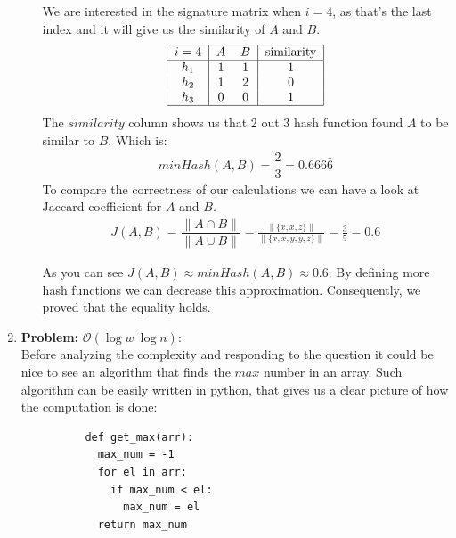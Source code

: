 \documentclass[11pt,a4paper,english]{article}
\begin{document}
\begin{enumerate}
\begin{enumerate}
            We are interested in the signature matrix when $i=4$, as that's the last index and it will give us the similarity of $A$ and $B$.
            \begin{align*}
              \begin{tabular}{|c | c c | c | }\hline
                $i=4$ & $A$ & $B$ & similarity\\ \hline
                $h_1$ &  1  &  1  & 1\\
                $h_2$ &  1  &  2  & 0\\
                $h_3$ &  0  &  0  & 1\\  \hline
              \end{tabular}
            \end{align*}
            The $similarity$ column shows us that 2 out 3 hash function found $A$ to be similar to $B$. Which is:
            \begin{align*}
              minHash(A,B) = \dfrac{2}{3} = 0.666\bar{6}
            \end{align*}
            To compare the correctness of our calculations we can have a look at Jaccard coefficient for $A$ and $B$.
            \begin{align*}
              J(A,B) = \dfrac{\| A \cap B \|}{\| A \cup B \|} =
              \frac{ \| \{ x,x,z\} \| }{ \| \{ x,x,y,y,z \} \| } = \frac{3}{5} = 0.6
            \end{align*}

            As you can see $J(A,B) \approx minHash(A,B) \approx 0.6$. By defining more hash functions we can decrease this approximation. Consequently, we proved that the equality holds.
        \end{enumerate}

      \item \textbf{Problem:} $\mathcal{O}(\log{w}\ \log{n})$: \\
        Before analyzing the complexity and responding to the question it could be nice to see an algorithm that finds the $max$ number in an array. Such algorithm can be easily written in python, that gives us a clear picture of how the computation is done:
        \begin{verbatim}
          def get_max(arr):
            max_num = -1
            for el in arr:
              if max_num < el:
                max_num = el
            return max_num
        \end{verbatim}


\end{enumerate}
\end{document}
